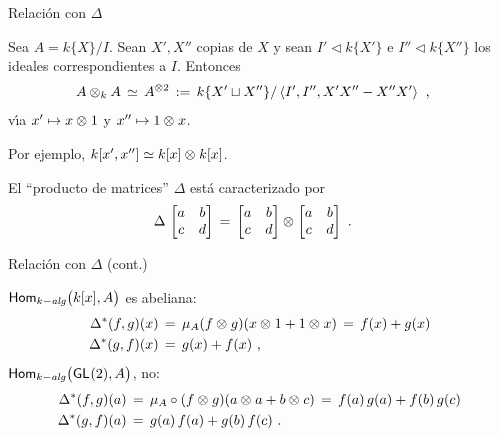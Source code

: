 \begin{frame}{Relaci\'{o}n con $\Delta$}
	\begin{propoProductoDeCociente}\label{propo:productodecociente}
		Sea $A=k\{X\}/I$. Sean $X',X''$ copias de $X$ y sean
		$I'\triangleleft k\{X'\}$ e $I''\triangleleft k\{X''\}$ los
		ideales correspondientes a $I$. Entonces
		\begin{align*}
			A\tensor[k]A & \,\simeq\, A^{\otimes 2}\,:=\,
				k\{X'\sqcup X''\}/\generado{I',I'',X'X''-X''X'}
			\text{ ,}
		\end{align*}
		v\'{\i}a $x'\mapsto x\tensor 1$ y $x''\mapsto 1\tensor x$.
	\end{propoProductoDeCociente}
	Por ejemplo, $k[x',x'']\simeq k[x]\tensor k[x]$.
	\begin{obsProductoDeMatrices}\label{obs:productodematrices}
		El ``producto de matrices'' $\Delta$ est\'{a} caracterizado por
		\begin{align*}
			\Delta\,\begin{bmatrix} a & b \\ c & d \end{bmatrix}
				& \,=\,
			\begin{bmatrix} a & b \\ c & d \end{bmatrix}\tensor
			\begin{bmatrix} a & b \\ c & d \end{bmatrix}
			\text{ .}
		\end{align*}
	\end{obsProductoDeMatrices}
\end{frame}

\begin{frame}{Relaci\'{o}n con $\Delta$ (cont.)}
	\begin{obsRectaAfinAbeliana}\label{obs:rectaafinabeliana}
		$\Homalg\big(k[x],A\big)$ es abeliana:
		\begin{align*}
			\pull\Delta(f,g)(x) & \,=\,
				\mu_A(f\tensor g) (x\tensor 1 + 1\tensor x)
				\,=\, f(x) + g(x) \\
			\pull\Delta(g,f)(x) & \,=\, g(x) + f(x)
			\text{ ,}
		\end{align*}
		$\Homalg\big(\GL(2),A\big)$, no:
		\begin{align*}
			\pull\Delta(f,g)(a) & \,=\,
				\mu_A\circ(f\tensor g)
					(a\tensor a+b\tensor c)
				\,=\,f(a)\,g(a)+f(b)\,g(c) \\
			\pull\Delta(g,f)(a) & \,=\,g(a)\,f(a)+g(b)\,f(c)
				\text{ .}
		\end{align*}
	\end{obsRectaAfinAbeliana}
\end{frame}
